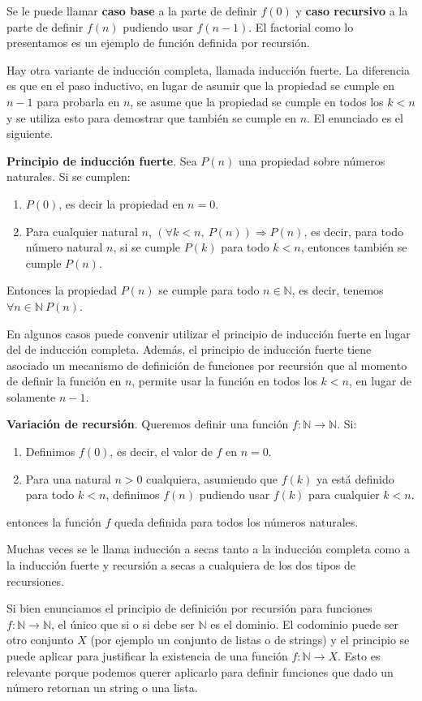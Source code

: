 \documentclass[a4paper, 12pt]{report}
\newcommand{\Ra}{\Rightarrow}
\newcommand{\N}{\mathbb{N}}
\theoremstyle{definition}
\begin{document}
\vspace{0.5em}
Se le puede llamar {\bf caso base} a la parte de definir $f(0)$ y {\bf caso recursivo} a la parte de definir $f(n)$ pudiendo usar $f(n-1)$.
El factorial como lo presentamos es un ejemplo de función definida por recursión.

Hay otra variante de inducción completa, llamada inducción fuerte. La diferencia es que en el paso inductivo, en lugar de asumir que la propiedad se cumple en $n-1$ para probarla en $n$, se asume que la propiedad se cumple en todos los $k<n$ y se utiliza esto para demostrar que también se cumple en $n$. El enunciado es el siguiente.

{\bf Principio de inducción fuerte}. Sea $P(n)$ una propiedad sobre números naturales. Si se cumplen:
\begin{enumerate}
	\item $P(0)$, es decir la propiedad en $n=0$. 
	\item Para cualquier natural $n$,  $(\forall k<n,~P(n))\Ra P(n)$, es decir, para todo número natural $n$, si se cumple $P(k)$ para todo $k<n$, entonces también se cumple $P(n)$. 
\end{enumerate} 
Entonces la propiedad $P(n)$ se cumple para todo $n\in\N$, es decir, tenemos $\forall n\in\N~P(n)$.

En algunos casos puede convenir utilizar el principio de inducción fuerte en lugar del de inducción completa. Además, el principio de inducción fuerte tiene asociado un mecanismo de definición de funciones por recursión que al momento de definir la función en $n$, permite usar la función en todos los $k<n$, en lugar de solamente $n-1$.

{\bf Variación de recursión}. Queremos definir una función $f:\N\to\N$. Si:
\begin{enumerate}
	\item Definimos $f(0)$, es decir, el valor de $f$ en $n=0$.
	\item Para una natural $n>0$ cualquiera, asumiendo que $f(k)$ ya está definido para todo $k<n$, definimos $f(n)$ pudiendo usar $f(k)$ para cualquier $k<n$.
\end{enumerate}
entonces la función $f$ queda definida para todos los números naturales.

Muchas veces se le llama inducción a secas tanto a la inducción completa como a la inducción fuerte y recursión a secas a cualquiera de los dos tipos de recursiones.

Si bien enunciamos el principio de definición por recursión para funciones $f:\N\to\N$, el único que si o si debe ser $\N$ es el dominio. El codominio puede ser otro conjunto $X$ (por ejemplo un conjunto de listas o de strings) y el principio se puede aplicar para justificar la existencia de una función $f:\N\to X$. Esto es relevante porque podemos querer aplicarlo para definir funciones que dado un número retornan un string o una lista.
\end{document}

